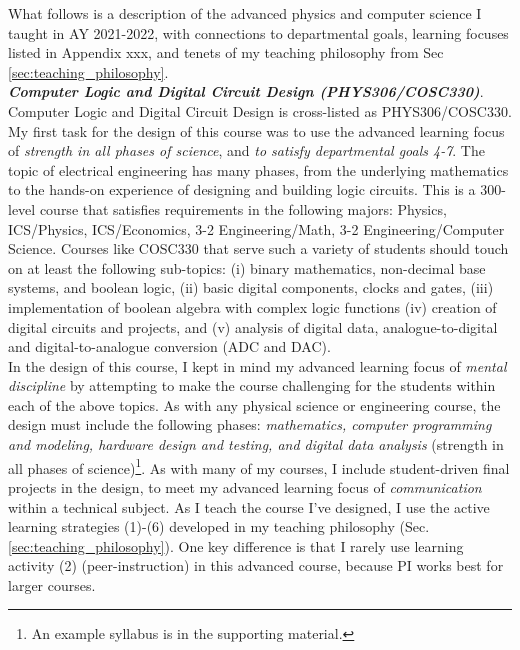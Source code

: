 \documentclass[../../../main.tex]{subfiles}
\begin{document}
What follows is a description of the advanced physics and computer science I taught in AY 2021-2022, with connections to departmental goals, learning focuses listed in Appendix xxx, and tenets of my teaching philosophy from Sec \ref{sec:teaching_philosophy}.
\\
\vspace{0.25cm}
\textbf{\textit{Computer Logic and Digital Circuit Design (PHYS306/COSC330)}}. Computer Logic and Digital Circuit Design is cross-listed as PHYS306/COSC330.  My first task for the design of this course was to use the advanced learning focus of \textit{strength in all phases of science}, and \textit{to satisfy departmental goals 4-7}.  The topic of electrical engineering has many phases, from the underlying mathematics to the hands-on experience of designing and building logic circuits.  This is a 300-level course that satisfies requirements in the following majors: Physics, ICS/Physics, ICS/Economics, 3-2 Engineering/Math, 3-2 Engineering/Computer Science.  Courses like COSC330 that serve such a variety of students should touch on at least the following sub-topics: (i) binary mathematics, non-decimal base systems, and boolean logic, (ii) basic digital components, clocks and gates, (iii) implementation of boolean algebra with complex logic functions (iv) creation of digital circuits and projects, and (v) analysis of digital data, analogue-to-digital and digital-to-analogue conversion (ADC and DAC).
\\
\vspace{0.25cm}
In the design of this course, I kept in mind my advanced learning focus of \textit{mental discipline} by attempting to make the course challenging for the students within each of the above topics.  As with any physical science or engineering course, the design must include the following phases: \textit{mathematics, computer programming and modeling, hardware design and testing, and digital data analysis} (strength in all phases of science)\footnote{An example syllabus is in the supporting material.}.  As with many of my courses, I include student-driven final projects in the design, to meet my advanced learning focus of \textit{communication} within a technical subject.  As I teach the course I've designed, I use the active learning strategies (1)-(6) developed in my teaching philosophy (Sec. \ref{sec:teaching_philosophy}).  One key difference is that I rarely use learning activity (2) (peer-instruction) in this advanced course, because PI works best for larger courses.
\\
\end{document}
